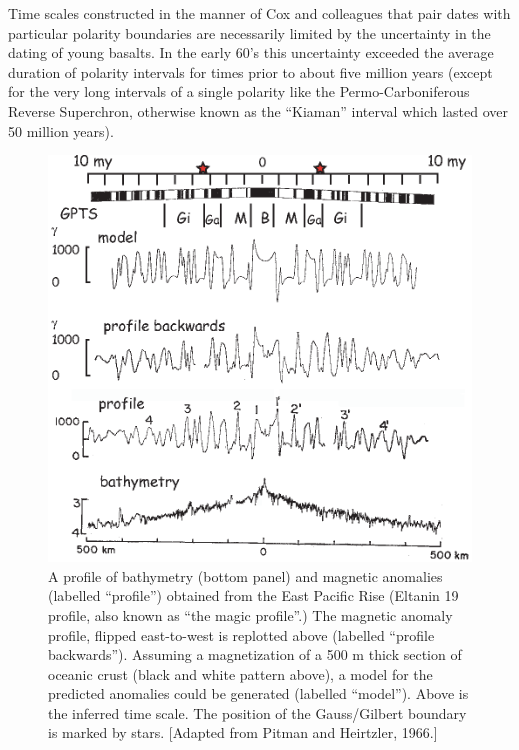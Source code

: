 Time scales constructed in the manner of 
Cox and colleagues that pair dates with particular polarity boundaries are necessarily limited by the uncertainty in the dating of young basalts.    In the early 60's this uncertainty exceeded the average duration of 
polarity intervals for times prior to about five million years (except for the very long intervals of a single polarity like the 
 Permo-Carboniferous Reverse Superchron, otherwise known as the 
``Kiaman'' interval which lasted over 50 million years).    



\begin{figure}[h!tb]
\centering  \includegraphics[width=12 cm]{EPSfiles/pitman66.eps}
\caption{A profile of bathymetry (bottom panel) and magnetic anomalies (labelled ``profile'') obtained from the East Pacific Rise (Eltanin 19 profile, also known as ``the magic profile''.)  The magnetic anomaly profile,  flipped east-to-west is replotted above (labelled ``profile backwards'').  Assuming a magnetization of a 500 m thick section of oceanic crust (black and white pattern above),  a model for the predicted anomalies could be generated (labelled ``model'').   Above is the inferred time scale.  The position of the Gauss/Gilbert boundary is marked by stars.   [Adapted from  Pitman and Heirtzler, 1966.]}
\label{fig:pitman66}
\end{figure}


